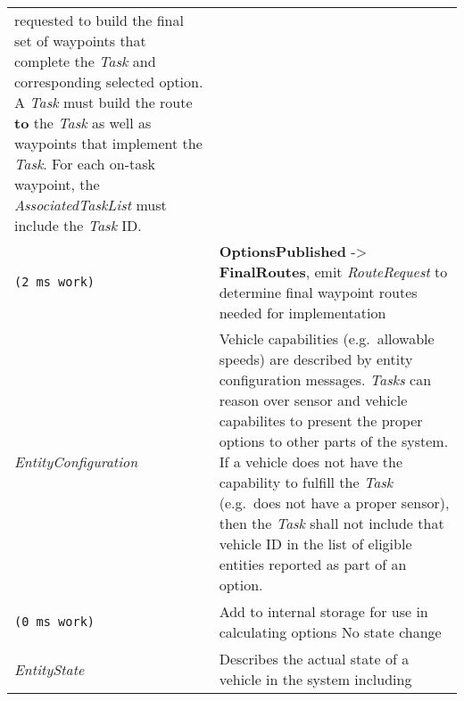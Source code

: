 \begin{longtable}[c]{@{}ll@{}}
\begin{minipage}[t]{0.65\columnwidth}
requested to build the final set of waypoints that complete the
\emph{Task} and corresponding selected option. A \emph{Task} must build
the route \textbf{to} the \emph{Task} as well as waypoints that
implement the \emph{Task}. For each on-task waypoint, the
\emph{AssociatedTaskList} must include the \emph{Task} ID.
\strut\end{minipage}\tabularnewline
\begin{minipage}[t]{0.29\columnwidth}\raggedright\strut
\begin{verbatim}
(2 ms work)
\end{verbatim}
\strut\end{minipage} &
\begin{minipage}[t]{0.65\columnwidth}\raggedright\strut
\textbf{OptionsPublished} -\textgreater{} \textbf{FinalRoutes}, emit
\emph{RouteRequest} to determine final waypoint routes needed for
implementation
\strut\end{minipage}\tabularnewline
\begin{minipage}[t]{0.29\columnwidth}\raggedright\strut
\emph{EntityConfiguration}
\strut\end{minipage} &
\begin{minipage}[t]{0.65\columnwidth}\raggedright\strut
Vehicle capabilities (e.g.~allowable speeds) are described by entity
configuration messages. \emph{Tasks} can reason over sensor and vehicle
capabilites to present the proper options to other parts of the system.
If a vehicle does not have the capability to fulfill the \emph{Task}
(e.g.~does not have a proper sensor), then the \emph{Task} shall not
include that vehicle ID in the list of eligible entities reported as
part of an option.
\strut\end{minipage}\tabularnewline
\begin{minipage}[t]{0.29\columnwidth}\raggedright\strut
\begin{verbatim}
(0 ms work)
\end{verbatim}
\strut\end{minipage} &
\begin{minipage}[t]{0.65\columnwidth}\raggedright\strut
Add to internal storage for use in calculating options No state change
\strut\end{minipage}\tabularnewline
\begin{minipage}[t]{0.29\columnwidth}\raggedright\strut
\emph{EntityState}
\strut\end{minipage} &
\begin{minipage}[t]{0.65\columnwidth}\raggedright\strut
Describes the actual state of a vehicle in the system including

\end{minipage}
\end{longtable}
